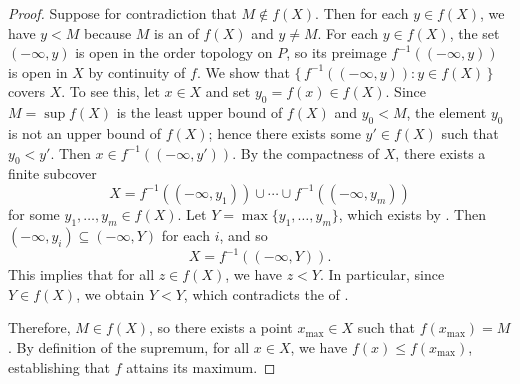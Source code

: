 \begin{proof}
    Suppose for contradiction that $M \notin f(X)$. Then for each $y \in f(X)$, we have $y < M$ because $M$ is an  of $f(X)$ and $y \neq M$. For each $y \in f(X)$, the set $(-\infty, y)$ is open in the order topology on $P$, so its preimage $f^{-1}((-\infty, y))$ is open in $X$ by continuity of $f$. We show that $\{\, f^{-1}((-\infty, y)) : y \in f(X) \,\}$ covers $X$. To see this, let $x \in X$ and set $y_0 = f(x) \in f(X)$. Since $M = \sup f(X)$ is the least upper bound of $f(X)$ and $y_0 < M$, the element $y_0$ is not an upper bound of $f(X)$; hence there exists some $y' \in f(X)$ such that $y_0 < y'$. Then $x \in f^{-1}((-\infty, y'))$. By the compactness of $X$, there exists a finite subcover
    $$X = f^{-1}((-\infty, y_1)) \cup \cdots \cup f^{-1}((-\infty, y_m))$$
    for some $y_1, \dots, y_m \in f(X)$. Let $Y = \max\{y_1, \dots, y_m\}$, which exists by . Then $(-\infty, y_i) \subseteq (-\infty, Y)$ for each $i$, and so
    $$X = f^{-1}((-\infty, Y)).$$
    This implies that for all $z \in f(X)$, we have $z < Y$. In particular, since $Y \in f(X)$, we obtain $Y < Y$, which contradicts the  of .

    Therefore, $M \in f(X)$, so there exists a point $x_{\max} \in X$ such that $f(x_{\max}) = M$. By definition of the supremum, for all $x \in X$, we have $f(x) \leq f(x_{\max})$, establishing that $f$ attains its maximum.
\end{proof}


